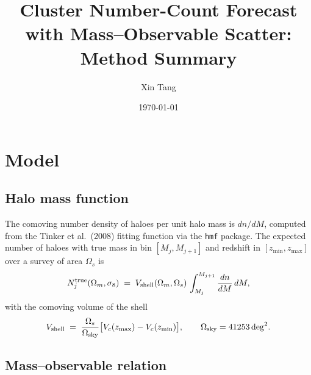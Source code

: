\documentclass[11pt,a4paper]{article}
\title{Cluster Number-Count Forecast with Mass--Observable Scatter:\\ Method Summary}
\author{Xin Tang}
\date{\today}
\begin{document}
\maketitle

\section{Model}

\subsection{Halo mass function}

The comoving number density of haloes per unit halo mass is $dn/dM$,
computed from the Tinker et al.~(2008) fitting function via the
\texttt{hmf} package. The expected number of haloes with true mass in
bin $[M_j, M_{j+1}]$ and redshift in $[z_{\min}, z_{\max}]$ over a survey
of area $\Omega_s$ is
\begin{equation}
    N_j^{\rm true}(\Omega_m, \sigma_8)
    \;=\; V_{\rm shell}(\Omega_m, \Omega_s) \, \int_{M_j}^{M_{j+1}} \frac{dn}{dM}\, dM ,
    \label{eq:Ntrue}
\end{equation}
with the comoving volume of the shell
\begin{equation}
    V_{\rm shell}
    \;=\; \frac{\Omega_s}{\Omega_{\rm sky}}
    \bigl[ V_c(z_{\max}) - V_c(z_{\min}) \bigr],
    \qquad \Omega_{\rm sky} = 41253\,{\rm deg}^2 .
\end{equation}

\subsection{Mass--observable relation}
\end{document}
